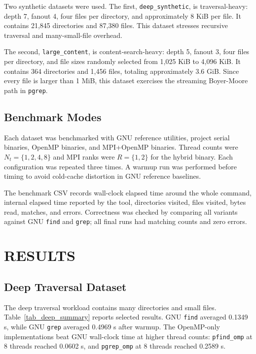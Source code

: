 \documentclass[twocolumn,10pt]{asme2e}
\begin{document}
Two synthetic datasets were used. The first, \texttt{deep\_synthetic}, is traversal-heavy: depth 7, fanout 4, four files per directory, and approximately 8 KiB per file. It contains 21,845 directories and 87,380 files. This dataset stresses recursive traversal and many-small-file overhead.

The second, \texttt{large\_content}, is content-search-heavy: depth 5, fanout 3, four files per directory, and file sizes randomly selected from 1,025 KiB to 4,096 KiB. It contains 364 directories and 1,456 files, totaling approximately 3.6 GiB. Since every file is larger than 1 MiB, this dataset exercises the streaming Boyer-Moore path in \texttt{pgrep}.

\subsection*{Benchmark Modes}

Each dataset was benchmarked with GNU reference utilities, project serial binaries, OpenMP binaries, and MPI+OpenMP binaries. Thread counts were $N_t=\{1,2,4,8\}$ and MPI ranks were $R=\{1,2\}$ for the hybrid binary. Each configuration was repeated three times. A warmup run was performed before timing to avoid cold-cache distortion in GNU reference baselines.

The benchmark CSV records wall-clock elapsed time around the whole command, internal elapsed time reported by the tool, directories visited, files visited, bytes read, matches, and errors. Correctness was checked by comparing all variants against GNU \texttt{find} and \texttt{grep}; all final runs had matching counts and zero errors.

\section*{RESULTS}

\subsection*{Deep Traversal Dataset}

The deep traversal workload contains many directories and small files. Table~\ref{tab_deep_summary} reports selected results. GNU \texttt{find} averaged 0.1349 s, while GNU \texttt{grep} averaged 0.4969 s after warmup. The OpenMP-only implementations beat GNU wall-clock time at higher thread counts: \texttt{pfind\_omp} at 8 threads reached 0.0602 s, and \texttt{pgrep\_omp} at 8 threads reached 0.2589 s.
\end{document}
